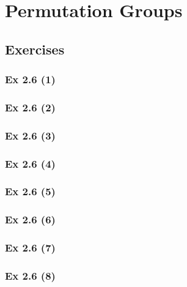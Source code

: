 \newpage		%

\section{Permutation Groups}\label{sec:2.6}
\subsection{Exercises}\label{sec:2.6_Exercises}

\subsubsection{Ex 2.6 (1)}\label{sec:Ex_2.6.1}

\subsubsection{Ex 2.6 (2)}\label{sec:Ex_2.6.2}

\subsubsection{Ex 2.6 (3)}\label{sec:Ex_2.6.3}

\subsubsection{Ex 2.6 (4)}\label{sec:Ex_2.6.4}

\subsubsection{Ex 2.6 (5)}\label{sec:Ex_2.6.5}

\subsubsection{Ex 2.6 (6)}\label{sec:Ex_2.6.6}

\subsubsection{Ex 2.6 (7)}\label{sec:Ex_2.6.7}

\subsubsection{Ex 2.6 (8)}\label{sec:Ex_2.6.8}

